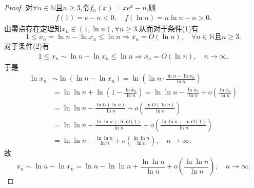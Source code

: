 \documentclass[../../main.tex]{subfiles}%
\begin{document}
\begin{proof}

对$\forall n\in \mathbb{N}$且$n\geqslant 3$,令$f_n(x) = xe^{x}-n$,则
\begin{align*}
f(1)=e-n<0,\quad f(\ln n)=n\ln n-n>0.
\end{align*}
由零点存在定理知$x_n\in (1,\ln n),\forall n\geqslant 3$.从而对于条件(1)有
\[
1 \leqslant x_n = \ln n - \ln x_n \leqslant \ln n \Rightarrow x_n = O(\ln n), \quad \forall n\in \mathbb{N}\text{且}n\geqslant 3.
\]
对于条件(2)有
\begin{align*}
1 \leqslant x_n \sim \ln n - \ln x_n \leqslant \ln n \Rightarrow x_n = O(\ln n),\quad  n\to \infty.
\end{align*}
于是
\begin{align}
\ln x_n&\sim \ln \left( \ln n-\ln x_n \right) =\ln \left( \ln n\cdot \frac{\ln n-\ln x_n}{\ln n} \right)\nonumber\\
&=\ln\ln n+\ln \left( 1-\frac{\ln x_n}{\ln n} \right) =\ln\ln n-\frac{\ln x_n}{\ln n}+o\left( \frac{\ln x_n}{\ln n} \right)\nonumber\\
&=\ln\ln n-\frac{\ln O(\ln n)}{\ln n}+o\left( \frac{\ln O(\ln n)}{\ln n} \right)\nonumber\\
&=\ln\ln n-\frac{\ln\ln n+\ln O(1)}{\ln n}+o\left( \frac{\ln\ln n+\ln O(1)}{\ln n} \right)\nonumber\\
&=\ln\ln n-\frac{\ln\ln n}{\ln n}+o\left( \frac{\ln\ln n}{\ln n} \right) ,\quad n\to \infty.\label{eq::F---HIOUHJWOFHJIOJWIUIOU89389423789}
\end{align}
故
\[
x_n \sim\ln n-\ln x_n= \ln n - \ln \ln n + \frac{\ln \ln n}{\ln n} + o\left( \frac{\ln \ln n}{\ln n} \right),\quad n\to \infty.
\]


\end{proof}
\end{document}
